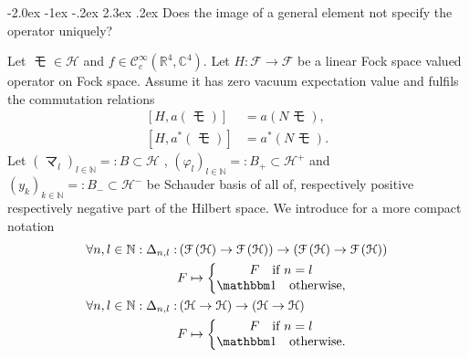 \documentclass[oneside,reqno,12pt]{amsart}
\makeatletter
\DeclareMathOperator{\ma}{マ}
\DeclareMathOperator{\mo}{モ}
\newcommand{\id}{{\mathbbm 1}}
\renewcommand\section{\@startsection {section}{1}{\z@}%
                                   {-2.0ex \@plus -1ex \@minus -.2ex}%
                                   {2.3ex \@plus.2ex}%
                                   {\normalfont\Large\bfseries}}
\makeatother
\begin{document}
\section{Does the image of a general element not specify the operator uniquely?}


Let \(\mo \in \mathcal{H}\) and \(f\in \mathcal{C}_c^\infty\left( \mathbb{R}^4, \mathbb{C}^4 \right) \). Let \(H: \mathcal{F}\rightarrow \mathcal{F}\) be a linear Fock space valued operator on Fock space. Assume it has zero vacuum expectation value and fulfils the commutation relations
\begin{align}\label{commH1}
\left[ H, a(\mo)\right] &= a\left( N\mo \right),\\\label{commH2}
\left[ H, a^*(\mo)\right] &= a^*\left( N\mo \right).
\end{align}
Let \((\ma_l)_{l\in\mathbb{N}}=:B \subset \mathcal{H}\) , \((\varphi_l)_{l\in\mathbb{N}}=:B_+ \subset \mathcal{H}^+\) 
and \((y_k)_{k\in\mathbb{N}}=:B_-\subset \mathcal{H}^-\) be Schauder basis of all of, respectively positive respectively negative part of the Hilbert space. We introduce for a more compact notation
\begin{align*}
\forall n,l\in\mathbb{N}: \Delta_{n,l} : & \left(\mathcal{F}\left( \mathcal{H}\right) \rightarrow \mathcal{F}\left(\mathcal{H}\right) \right) \rightarrow \left(\mathcal{F}\left( \mathcal{H}\right) \rightarrow \mathcal{F}\left(\mathcal{H}\right) \right) \\
& F \mapsto \left\{\begin{matrix}
F \quad \text{if } n=l\\
\id \quad \text{otherwise},
\end{matrix}\right.\\
\forall n,l\in\mathbb{N}: \Delta_{n,l} : & \left( \mathcal{H}\rightarrow \mathcal{H} \right) \rightarrow \left(\mathcal{H} \rightarrow \mathcal{H} \right) \\
& F \mapsto \left\{\begin{matrix}
F \quad \text{if } n=l\\
\id \quad \text{otherwise}.
\end{matrix}\right.
\end{align*}
\end{document}
